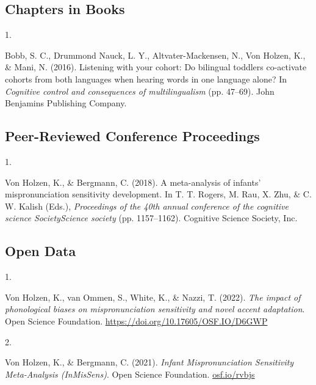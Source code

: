 \documentclass[10pt,a4paper,]{article}
\newlength{\cslhangindent}
\newlength{\csllabelwidth}
\newcommand{\CSLLeftMargin}[1]{\parbox[t]{\csllabelwidth}{\hfill #1~}}
\newcommand{\CSLRightInline}[1]{\parbox[t]{\linewidth - \cslhangindent - \csllabelwidth}{#1}\vspace{0.8ex}}
\begin{document}
\hypertarget{chapters-in-books}{%
\subsection{Chapters in Books}\label{chapters-in-books}}

\hypertarget{bibliography}{}
\leavevmode{}%
\CSLLeftMargin{1. }%
\CSLRightInline{Bobb, S. C., Drummond Nauck, L. Y., Altvater-Mackensen,
N., Von Holzen, K., \& Mani, N. (2016). Listening with your cohort: Do
bilingual toddlers co-activate cohorts from both languages when hearing
words in one language alone? In \emph{Cognitive control and consequences
of multilingualism} (pp. 47--69). John Benjamins Publishing Company.}

\hypertarget{peer-reviewed-conference-proceedings}{%
\subsection{Peer-Reviewed Conference
Proceedings}\label{peer-reviewed-conference-proceedings}}

\hypertarget{bibliography}{}
\leavevmode{}%
\CSLLeftMargin{1. }%
\CSLRightInline{Von Holzen, K., \& Bergmann, C. (2018). A meta-analysis
of infants' mispronunciation sensitivity development. In T. T. Rogers,
M. Rau, X. Zhu, \& C. W. Kalish (Eds.), \emph{Proceedings of the 40th
annual conference of the cognitive science SocietyScience society} (pp.
1157--1162). Cognitive Science Society, Inc.}

\hypertarget{open-data}{%
\subsection{Open Data}\label{open-data}}

\hypertarget{bibliography}{}
\leavevmode{}%
\CSLLeftMargin{1. }%
\CSLRightInline{Von Holzen, K., van Ommen, S., White, K., \& Nazzi, T.
(2022). \emph{The impact of phonological biases on mispronunciation
sensitivity and novel accent adaptation}. Open Science Foundation.
\url{https://doi.org/10.17605/OSF.IO/D6GWP}}

\leavevmode{}%
\CSLLeftMargin{2. }%
\CSLRightInline{Von Holzen, K., \& Bergmann, C. (2021). \emph{Infant
Mispronunciation Sensitivity Meta-Analysis (InMisSens)}. Open Science
Foundation. \href{https://osf.io/rvbjs}{osf.io/rvbjs}}
\end{document}
